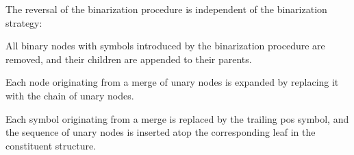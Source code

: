 \documentclass[../../document.tex]{subfiles}
\begin{document}
    The reversal of the binarization procedure is independent of the binarization strategy:
    \begin{compactenum}
        \item All binary nodes with symbols introduced by the binarization procedure are removed, and their children are appended to their parents.
        \item Each node originating from a merge of unary nodes is expanded by replacing it with the chain of unary nodes.
        \item Each  symbol originating from a merge is replaced by the trailing pos symbol, and the sequence of unary nodes is inserted atop the corresponding leaf in the constituent structure.
    \end{compactenum}

\end{document}
